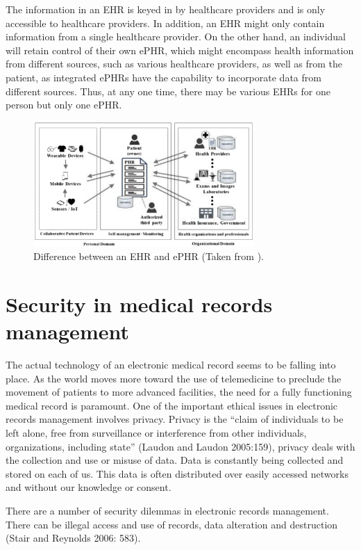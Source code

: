The information in an EHR is keyed in by healthcare providers and is only accessible to healthcare providers. In addition, an EHR might only contain information from a single healthcare provider. On the other hand, an individual will retain control of their own ePHR, which might encompass health information from different sources, such as various healthcare providers, as well as from the patient, as integrated ePHRs have the capability to incorporate data from different sources. Thus, at any one time, there may be various EHRs for one person but only one ePHR\cite{alsahafiOverviewElectronicPersonal2018}.
\begin{figure}[h!]
  \center
  \includegraphics[width=0.75\textwidth]{images/chapter1/phr_ehr.PNG}
  \caption{Difference between an EHR and ePHR (Taken from \cite{alsahafiOverviewElectronicPersonal2018}).}
  \label{fig:ehrvsphr}
\end{figure}

\section{Security in medical records management}
The actual technology of an electronic medical record seems to be falling into place. As the world moves more toward the use of telemedicine to preclude the movement of patients to more advanced facilities, the need for a fully functioning medical record is paramount.
One of the important ethical issues in electronic records management involves privacy. Privacy is the “claim of individuals to be left alone, free from surveillance or interference from other individuals, organizations, including state” (Laudon and Laudon 2005:159), privacy deals with the collection and use or misuse of data. Data is constantly being collected and stored on each of us. This data is often distributed over easily accessed networks and without our knowledge or consent\cite{ngoepeSecurityPrivacyEthics2011}.
 
 
There are a number of security dilemmas in electronic records management. There can be illegal access and use of records, data alteration and destruction (Stair and Reynolds 2006: 583).

